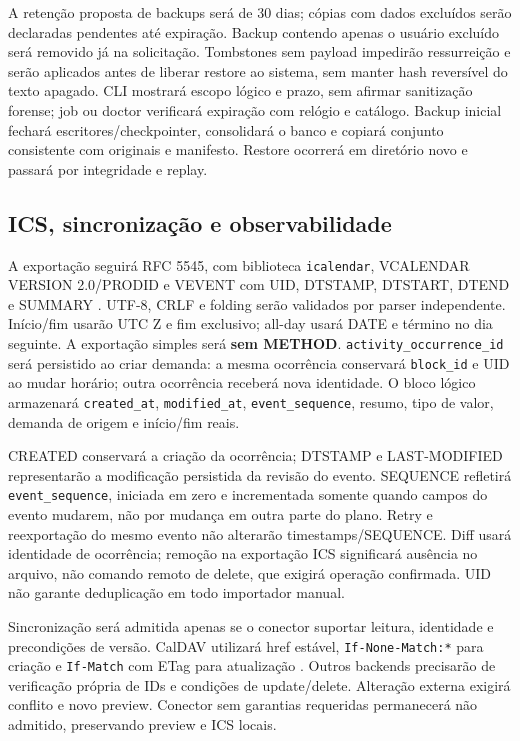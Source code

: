 \documentclass[12pt]{article}
\let\cite\citep
\newcommand{\code}[1]{\nolinkurl{#1}}
\begin{document}
A retenção proposta de backups será de 30 dias; cópias com dados excluídos serão declaradas pendentes até expiração. Backup contendo apenas o usuário excluído será removido já na solicitação. Tombstones sem payload impedirão ressurreição e serão aplicados antes de liberar restore ao sistema, sem manter hash reversível do texto apagado. CLI mostrará escopo lógico e prazo, sem afirmar sanitização forense; job ou doctor verificará expiração com relógio e catálogo. Backup inicial fechará escritores/checkpointer, consolidará o banco e copiará conjunto consistente com originais e manifesto. Restore ocorrerá em diretório novo e passará por integridade e replay.

\subsection{ICS, sincronização e observabilidade}

A exportação seguirá RFC 5545, com biblioteca \code{icalendar}, VCALENDAR VERSION 2.0/PRODID e VEVENT com UID, DTSTAMP, DTSTART, DTEND e SUMMARY \cite{desruisseaux2009icalendar}. UTF-8, CRLF e folding serão validados por parser independente. Início/fim usarão UTC Z e fim exclusivo; all-day usará DATE e término no dia seguinte. A exportação simples será \textbf{sem METHOD}. \code{activity_occurrence_id} será persistido ao criar demanda: a mesma ocorrência conservará \code{block_id} e UID ao mudar horário; outra ocorrência receberá nova identidade. O bloco lógico armazenará \code{created_at}, \code{modified_at}, \code{event_sequence}, resumo, tipo de valor, demanda de origem e início/fim reais.

CREATED conservará a criação da ocorrência; DTSTAMP e LAST-MODIFIED representarão a modificação persistida da revisão do evento. SEQUENCE refletirá \code{event_sequence}, iniciada em zero e incrementada somente quando campos do evento mudarem, não por mudança em outra parte do plano. Retry e reexportação do mesmo evento não alterarão timestamps/SEQUENCE. Diff usará identidade de ocorrência; remoção na exportação ICS significará ausência no arquivo, não comando remoto de delete, que exigirá operação confirmada. UID não garante deduplicação em todo importador manual.

Sincronização será admitida apenas se o conector suportar leitura, identidade e precondições de versão. CalDAV utilizará href estável, \code{If-None-Match:*} para criação e \code{If-Match} com ETag para atualização \cite{daboo2007caldav}. Outros backends precisarão de verificação própria de IDs e condições de update/delete. Alteração externa exigirá conflito e novo preview. Conector sem garantias requeridas permanecerá não admitido, preservando preview e ICS locais.
\end{document}
